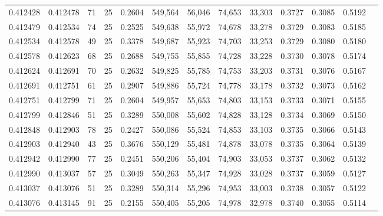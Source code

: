 \begin{tabular}{rrrrrrrrrrrrr}
0.412428 & 0.412478 &    71 &  25 &                                     0.2604 & 549,564 &  56,046 &  74,653 &  33,303 & 0.3727 & 0.3085 & 0.5192 \\
0.412479 & 0.412534 &    74 &  25 &                                     0.2525 & 549,638 &  55,972 &  74,678 &  33,278 & 0.3729 & 0.3083 & 0.5185 \\
0.412534 & 0.412578 &    49 &  25 &                                     0.3378 & 549,687 &  55,923 &  74,703 &  33,253 & 0.3729 & 0.3080 & 0.5180 \\
0.412578 & 0.412623 &    68 &  25 &                                     0.2688 & 549,755 &  55,855 &  74,728 &  33,228 & 0.3730 & 0.3078 & 0.5174 \\
0.412624 & 0.412691 &    70 &  25 &                                     0.2632 & 549,825 &  55,785 &  74,753 &  33,203 & 0.3731 & 0.3076 & 0.5167 \\
0.412691 & 0.412751 &    61 &  25 &                                     0.2907 & 549,886 &  55,724 &  74,778 &  33,178 & 0.3732 & 0.3073 & 0.5162 \\
0.412751 & 0.412799 &    71 &  25 &                                     0.2604 & 549,957 &  55,653 &  74,803 &  33,153 & 0.3733 & 0.3071 & 0.5155 \\
0.412799 & 0.412846 &    51 &  25 &                                     0.3289 & 550,008 &  55,602 &  74,828 &  33,128 & 0.3734 & 0.3069 & 0.5150 \\
0.412848 & 0.412903 &    78 &  25 &                                     0.2427 & 550,086 &  55,524 &  74,853 &  33,103 & 0.3735 & 0.3066 & 0.5143 \\
0.412903 & 0.412940 &    43 &  25 &                                     0.3676 & 550,129 &  55,481 &  74,878 &  33,078 & 0.3735 & 0.3064 & 0.5139 \\
0.412942 & 0.412990 &    77 &  25 &                                     0.2451 & 550,206 &  55,404 &  74,903 &  33,053 & 0.3737 & 0.3062 & 0.5132 \\
0.412990 & 0.413037 &    57 &  25 &                                     0.3049 & 550,263 &  55,347 &  74,928 &  33,028 & 0.3737 & 0.3059 & 0.5127 \\
0.413037 & 0.413076 &    51 &  25 &                                     0.3289 & 550,314 &  55,296 &  74,953 &  33,003 & 0.3738 & 0.3057 & 0.5122 \\
0.413076 & 0.413145 &    91 &  25 &                                     0.2155 & 550,405 &  55,205 &  74,978 &  32,978 & 0.3740 & 0.3055 & 0.5114 \\

\end{tabular}
